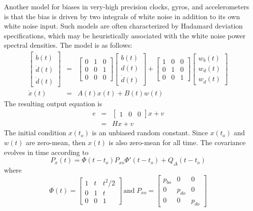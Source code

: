 Another model for biases in very-high precision clocks, gyros, and accelerometers is that the bias is driven by two integrals of white noise in addition to its own white noise input.  Such models are often characterized by Hadamard deviation specifications, which may be heuristically associated with the white noise power spectral densities.  The model is as follows:
\begin{eqnarray}
	\begin{bmatrix} \dot{b}(t) \\ \dot{d}(t) \\ \ddot{d}(t) \end{bmatrix} &=&
	\begin{bmatrix} 0 & 1 & 0 \\ 0 & 0 & 1 \\ 0 & 0 & 0 \end{bmatrix}
	\begin{bmatrix} b(t) \\ d(t) \\ \dot{d}(t) \end{bmatrix} +
	\begin{bmatrix} 1 & 0 & 0 \\ 0 & 1 & 0 \\ 0 & 0 & 1 \end{bmatrix}
	\begin{bmatrix} w_b(t) \\ w_d(t) \\ w_{\dot{d}}(t) \end{bmatrix} \\
	\dot{x}(t) &=& A(t) x(t) + B(t) w(t)
\end{eqnarray}
The resulting output equation is
\begin{eqnarray}
	e & = &  \begin{bmatrix} 1 & 0 & 0 \end{bmatrix} x + v \\
	& = & H x + v
\end{eqnarray}
The initial condition $x(t_o)$ is an unbiased random constant.  Since $x(t_o)$ and $w(t)$ are zero-mean, then $x(t)$ is also zero-mean for all time.  The covariance evolves in time according to
\begin{equation}
	P_x(t) = \Phi(t-t_o)P_{xo}\Phi'(t-t_o) + Q_\Delta(t-t_o)
\end{equation}
where
\begin{equation}
	\Phi(t) = \begin{bmatrix} 1 & t & t^2/2 \\ 0 & 1 & t \\ 0 & 0 & 1 \end{bmatrix} \, \text{and} \;
	P_{xo} = \begin{bmatrix} p_{bo} & 0 & 0 \\ 0 & p_{do} & 0 \\ 0 & 0 & p_{\dot{d}o} \end{bmatrix}
\end{equation}
